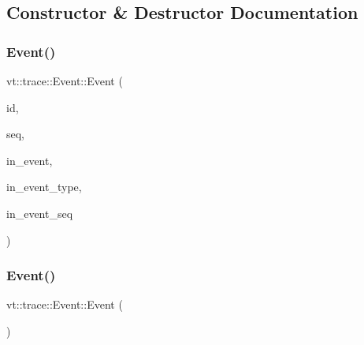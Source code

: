 \subsection{Constructor \& Destructor Documentation}
\mbox{\label{structvt_1_1trace_1_1_event_a6453f6c296f047b7caa653212c09da06}} 
\subsubsection{\texorpdfstring{Event()}{Event()}\hspace{0.1cm}{\footnotesize\ttfamily [1/3]}}
{\footnotesize\ttfamily vt\+::trace\+::\+Event\+::\+Event (\begin{DoxyParamCaption}\item[{\hyperlink{namespacevt_1_1trace_a3c14050715ba9eceaeff51fb3de64f2f}{Trace\+Entry\+I\+D\+Type}}]{id,  }\item[{\hyperlink{namespacevt_1_1trace_a522028dd2a7d056f0ec3d417836fdecd}{Trace\+Entry\+Seq\+Type}}]{seq,  }\item[{std\+::string const \&}]{in\+\_\+event,  }\item[{\hyperlink{namespacevt_1_1trace_a3c14050715ba9eceaeff51fb3de64f2f}{Trace\+Entry\+I\+D\+Type}}]{in\+\_\+event\+\_\+type,  }\item[{\hyperlink{namespacevt_1_1trace_a522028dd2a7d056f0ec3d417836fdecd}{Trace\+Entry\+Seq\+Type}}]{in\+\_\+event\+\_\+seq }\end{DoxyParamCaption})}

\mbox{\label{structvt_1_1trace_1_1_event_a4c9c1f89d57a79f7b51f16fd31ae578a}} 
\subsubsection{\texorpdfstring{Event()}{Event()}\hspace{0.1cm}{\footnotesize\ttfamily [2/3]}}
{\footnotesize\ttfamily vt\+::trace\+::\+Event\+::\+Event (\begin{DoxyParamCaption}\item[{\hyperlink{structvt_1_1trace_1_1_event}{Event} const \&}]{ }\end{DoxyParamCaption})\hspace{0.3cm}{\ttfamily [default]}}

